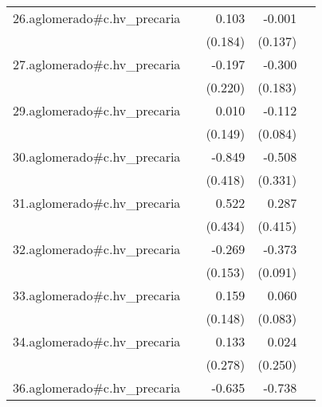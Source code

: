 {\begin{longtable}{l*{4}{D{.}{.}{-1}}}
\addlinespace
26.aglomerado#c.hv\_precaria&                     &       0.103         &      -0.001         &                     \\
            &                     &     (0.184)         &     (0.137)         &                     \\
\addlinespace
27.aglomerado#c.hv\_precaria&                     &      -0.197         &      -0.300         &                     \\
            &                     &     (0.220)         &     (0.183)         &                     \\
\addlinespace
29.aglomerado#c.hv\_precaria&                     &       0.010         &      -0.112         &                     \\
            &                     &     (0.149)         &     (0.084)         &                     \\
\addlinespace
30.aglomerado#c.hv\_precaria&                     &      -0.849\sym{*}  &      -0.508         &                     \\
            &                     &     (0.418)         &     (0.331)         &                     \\
\addlinespace
31.aglomerado#c.hv\_precaria&                     &       0.522         &       0.287         &                     \\
            &                     &     (0.434)         &     (0.415)         &                     \\
\addlinespace
32.aglomerado#c.hv\_precaria&                     &      -0.269         &      -0.373\sym{***}&                     \\
            &                     &     (0.153)         &     (0.091)         &                     \\
\addlinespace
33.aglomerado#c.hv\_precaria&                     &       0.159         &       0.060         &                     \\
            &                     &     (0.148)         &     (0.083)         &                     \\
\addlinespace
34.aglomerado#c.hv\_precaria&                     &       0.133         &       0.024         &                     \\
            &                     &     (0.278)         &     (0.250)         &                     \\
\addlinespace
36.aglomerado#c.hv\_precaria&                     &      -0.635\sym{**} &      -0.738\sym{***}&                     \\

\end{longtable}}
